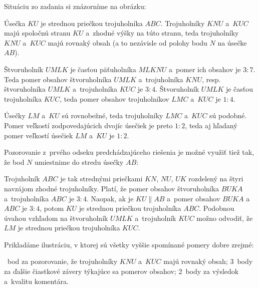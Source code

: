 {%
Situáciu zo zadania si znázorníme na obrázku:
%

Úsečka $KU$ je strednou priečkou trojuholníka $ABC$.
Trojuholníky $KNU$ a~$KUC$ majú spoločnú stranu $KU$ a~zhodné výšky na túto stranu, teda trojuholníky $KNU$ a~$KUC$ majú rovnaký obsah (a to nezávisle od polohy bodu $N$ na úsečke $ AB$).

Štvoruholník $UMLK$ je časťou päťuholníka $MLKNU$ a~pomer ich obsahov je $3:7$.
Teda pomer obsahov štvoruholníka $UMLK$ a~trojuholníka $KNU$, resp. štvoruholníka $UMLK$ a~trojuholníka $KUC$ je $3:4$.
Štvoruholník $UMLK$ je časťou trojuholníka $KUC$, teda pomer obsahov trojuholníkov $LMC$ a~$KUC$ je $1:4$.

Úsečky $LM$ a~$KU$ sú rovnobežné, teda trojuholníky $LMC$ a~$KUC$ sú podobné.
Pomer veľkostí zodpovedajúcich dvojíc úsečiek je preto $1:2$, teda aj hľadaný pomer veľkostí úsečiek $LM$ a~$KU$ je $1:2$.

\poznamka
Pozorovanie z~prvého odseku predchádzajúceho riešenia je možné využiť tiež tak, že bod $N$ umiestnime do stredu úsečky $AB$:
%

Trojuholník $ABC$ je tak strednými priečkami $KN$, $NU$, $UK$ rozdelený na štyri navzájom zhodné trojuholníky.
Platí, že pomer obsahov štvoruholníka $BUKA$ a~trojuholníka $ABC$ je $3:4$.
Naopak, ak je $KU\|AB$ a~pomer obsahov $BUKA$ a~$ABC$ je $3:4$, potom $KU$ je strednou priečkou trojuholníka $ABC$.
Podobnou úvahou vzhľadom na štvoruholník $UMLK$ a~trojuholník $KUC$ možno odvodiť, že $LM$ je strednou priečkou trojuholníka $KUC$.

Prikladáme ilustráciu, v ktorej sú všetky vyššie spomínané pomery dobre zrejmé:
%

~bod za pozorovanie, že trojuholníky $KNU$ a~$KUC$ majú rovnaký obsah;
3~body za ďalšie čiastkové závery týkajúce sa pomerov obsahov;
2~body za výsledok a~kvalitu komentára.
\endhodnotenie
}

